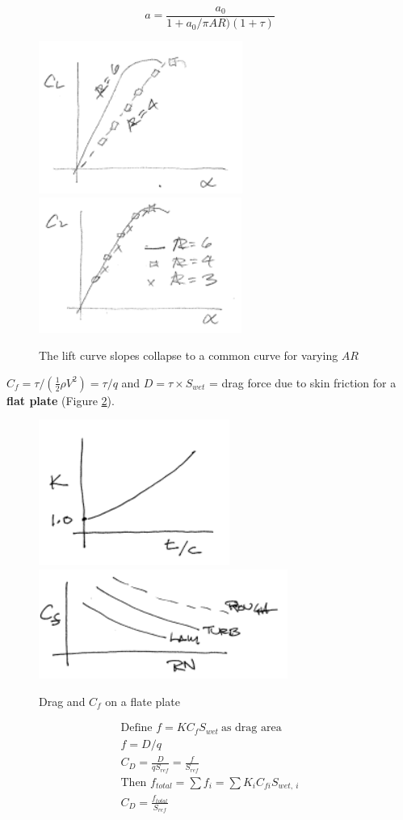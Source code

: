 \documentclass[draft=false, titlepage]{article}
\begin{document}
\begin{equation}
    a = \frac{a_0}{1+a_0/\pi AR) (1+\tau)}
    \label{eq:3DLiftCurveSlope}
\end{equation}
\begin{figure}[ht]
    \centering
    \includegraphics[width=0.3\linewidth]{Figures/dragPolar_ClPg122.PNG}
    \includegraphics[width=0.3\linewidth]{Figures/dragPolar_Cl2Pg122.PNG}
    \caption{The lift curve slopes collapse to a common curve for varying $AR$}
    \label{fig:liftCurveSlopeCollapse}
\end{figure}

$C_f = \tau /(\frac{1}{2}\rho V^2) = \tau/q$ and $D = \tau \times S_{wet}$ = drag force due to skin friction for a \textbf{flat plate} (Figure \ref{fig:dragFlatPlate}).

\begin{figure}[ht]
    \centering
    \includegraphics[width=0.3\linewidth]{Figures/dragFlatPlatePg123.PNG}
    \includegraphics[width=0.3\linewidth]{Figures/CfflatPlatePg123.PNG}
    \caption{Drag and $C_f$ on a flate plate}
    \label{fig:dragFlatPlate}
\end{figure}

\begin{gather*}
    \text{Define } f = KC_f S_{wet} \ \text{as drag area}\\
    f = D/q\\
    C_D = \frac{D}{qS_{ref}} = \frac{f}{S_{ref}}\\
    \text{Then } f_{total} = \sum f_i = \sum K_i C_{fi} S_{wet,\ i}\\
    C_D = \frac{f_{total}}{S_{ref}}
\end{gather*}
\end{document}
